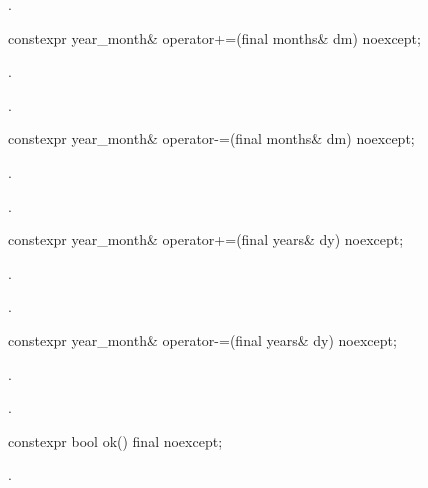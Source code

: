 \begin{itemdescr}
\pnum
\returns {}.
\end{itemdescr}

%
\begin{itemdecl}
constexpr year_month& operator+=(final months& dm) noexcept;
\end{itemdecl}

\begin{itemdescr}
\pnum
\effects {}.

\pnum
\returns {}.
\end{itemdescr}

%
\begin{itemdecl}
constexpr year_month& operator-=(final months& dm) noexcept;
\end{itemdecl}

\begin{itemdescr}
\pnum
\effects {}.

\pnum
\returns {}.
\end{itemdescr}

%
\begin{itemdecl}
constexpr year_month& operator+=(final years& dy) noexcept;
\end{itemdecl}

\begin{itemdescr}
\pnum
\effects {}.

\pnum
\returns {}.
\end{itemdescr}

%
\begin{itemdecl}
constexpr year_month& operator-=(final years& dy) noexcept;
\end{itemdecl}

\begin{itemdescr}
\pnum
\effects {}.

\pnum
\returns {}.
\end{itemdescr}

%
\begin{itemdecl}
constexpr bool ok() final noexcept;
\end{itemdecl}

\begin{itemdescr}
\pnum
\returns {}.
\end{itemdescr}

